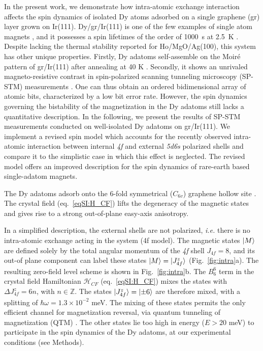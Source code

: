\documentclass[
reprint,amsmath,amssymb,aps]{revtex4-2}
\begin{document}
In the present work, we demonstrate how intra-atomic exchange interaction affects the spin dynamics of isolated Dy atoms adsorbed on a single graphene (gr) layer grown on Ir(111). Dy/gr/Ir(111) is one of the few examples of single atom magnets \cite{Natterer2018,kiralyOrbitallyDerivedSingleatom2018}, and it possesses a spin lifetimes of the order of 1000~s at 2.5~K \cite{baltic2016}. Despite lacking the thermal stability reported for Ho/MgO/Ag(100), this system has other unique properties. Firstly, Dy adatoms self-assemble on the Moiré pattern of gr/Ir(111) after annealing at 40 K \cite{pivettaDirectCaptureElectrostatic2018}. Secondly, it shows an unrivaled magneto-resistive contrast in spin-polarized scanning tunneling microscopy (SP-STM) measurements \cite{pivettaMeasuringIntraAtomicExchange2020}. One can thus obtain an ordered bidimensional array of atomic bits, characterized by a low bit error rate.
However, the spin dynamics governing the bistability of the magnetization in the Dy adatoms still lacks a quantitative  description.
In the following, we present the results of SP-STM  measurements conducted  on  well-isolated  Dy  adatoms on gr/Ir(111). We implement a revised spin model which accounts for the  recently  observed  intra-atomic  interaction  between internal \textit{4f} and  external \textit{5d6s} polarized  shells  \cite{pivettaMeasuringIntraAtomicExchange2020} and compare it to the simplistic case in which this effect is neglected. The revised model offers an improved description for the spin dynamics of rare-earth based single-adatom magnets.

The Dy adatoms adsorb onto the 6-fold symmetrical ($C_{6v}$) graphene hollow site \cite{baltic2018}. The crystal field (eq.~\ref{eqSI:H_CF}) lifts the degeneracy of the magnetic states and gives rise to a strong out-of-plane easy-axis anisotropy.

In a simplified description, the external shells are not polarized, \textit{i.e.} there is no intra-atomic exchange acting in the system (4f model).
The magnetic states $\ket{M}$ are defined solely by the total angular momentum of the \textit{4f} shell $J_{4f}=8$, and its out-of plane component can label these states $\ket{M}=\ket{J^{z}_{4f}}$ (Fig.~\ref{fig:intra}a). The resulting zero-field level scheme is shown in Fig.~\ref{fig:intra}b. The $B_6^6$ term in the crystal field Hamiltonian  $\mathcal{H}_{CF}$ (eq.~\ref{eqSI:H_CF}) mixes the states with $\Delta J^{z}_{4f}=6n$, with $n\in \mathbb{Z}$. The states $\ket{J^{z}_{4f}}=\ket{\pm 6}$ are therefore mixed, with a splitting of $\hbar\omega=1.3 \times 10^{-2}$ meV. The mixing of these states permits the only efficient channel for magnetization reversal, via quantum tunneling of magnetization (QTM) \citep{baltic2016}. The other states lie too high in energy ($E>20$ meV) to participate in the spin dynamics of the Dy adatoms, at our experimental conditions (see Methods).
\end{document}
